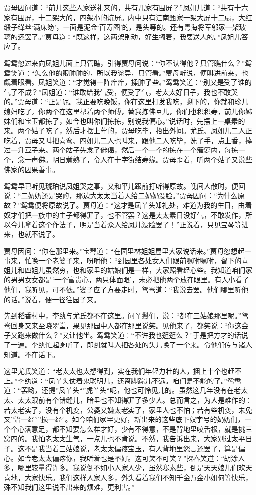 \documentclass[12pt,oneside]{book}
\begin{document}
贾母因问道：“前儿这些人家送礼来的，共有几家有围屏？”凤姐儿道：“共有十六家有围屏，十二架大的，四架小的炕屏。内中只有江南甄家一架大屏十二扇，大红缎子缂丝‘满床笏’，一面是泥金‘百寿图’的，是头等的。还有粤海将军邬家一架玻璃的还罢了。”贾母道：“既这样，这两架别动，好生搁着，我要送人的。”凤姐儿答应了。

鸳鸯忽过来向凤姐儿面上只管瞧，引得贾母问说：“你不认得他？只管瞧什么？”鸳鸯笑道：“怎么他的眼肿肿的，所以我诧异，只管看。”贾母听说，便叫进前来，也觑着眼看。凤姐笑道：“才觉得一阵痒痒，揉肿了些。”鸳鸯笑道：“别又是受了谁的气了不成？”凤姐道：“谁敢给我气受，便受了气，老太太好日子，我也不敢哭的。”贾母道：“正是呢。我正要吃晚饭，你在这里打发我吃，剩下的，你就和珍儿媳妇吃了。你两个在这里帮着两个师傅，替我拣佛豆儿，你们也积积寿，前儿你姊妹们和宝玉都拣了，如今也叫你们拣拣，别说我偏心。”说话时，先摆上一桌素的来。两个姑子吃了，然后才摆上荤的，贾母吃毕，抬出外间。尤氏、凤姐儿二人正吃着，贾母又叫把喜鸾、四姐儿二人也叫来，跟他二人吃毕，洗了手，点上香，捧过一升豆子来。两个姑子先念了佛偈，然后一个一个的拣在一个簸箩内，每拣一个，念一声佛。明日煮熟了，令人在十字街结寿缘。贾母歪着，听两个姑子又说些佛家的因果善事。

鸳鸯早已听见琥珀说凤姐哭之事，又和平儿跟前打听得原故。晚间人散时，便回说：“二奶奶还是哭的，那边大太太当着人给二奶奶没脸。”贾母因问：“为什么原故？”鸳鸯便将原故说了。贾母道：“这才是凤丫头知礼处，难道为我的生日，由着奴才们把一族中的主子都得罪了，也不管罢？这是太太素日没好气，不敢发作，所以今儿拿着这个作法子，明是当着众人给凤儿没脸罢了！”正说着，只见宝琴等进来，也就不说了。

贾母因问：“你在那里来。”宝琴道：“在园里林姐姐屋里大家说话来。”贾母忽想起一事来，忙唤一个老婆子来，吩咐他：“到园里各处女人们跟前嘱咐嘱咐，留下的喜姐儿和四姐儿虽然穷，也和家里的姑娘们是一样，大家照看经心些。我知道咱们家的男男女女都是‘一个富贵心，两只体面眼’，未必把他两个放在眼里。有人小看了他们，我听见，可不依。”婆子应了方要走时，鸳鸯道：“我说去罢。他们哪里听他的话。”说着，便一径往园子来。

先到稻香村中，李纨与尤氏都不在这里。问丫鬟们，说：“都在三姑娘那里呢。”鸳鸯回身又来至晓翠堂，果见那园中人都在那里说笑。见他来了，都笑说：“你这会子又跑来做什么？”又让他坐。鸳鸯笑道：“不许我也逛逛么？”于是把方才的话说了一遍。李纨忙起身听了，即刻就叫人把各处的头儿唤了一个来。令他们传与诸人知道。不在话下。

这里尤氏笑道：“老太太也太想得到，实在我们年轻力壮的人，捆上十个也赶不上。”李纨道：“凤丫头仗着鬼聪明儿，还离脚踪儿不远。咱们是不能的了。”鸳鸯道：“罢哟，还提”凤丫头“”虎丫头“呢，他也可怜见儿的。虽然这几年没有在老太太、太太跟前有个错缝儿，暗里也不知得罪了多少人。总而言之，为人是难作的：若太老实了，没有个机变，公婆又嫌太老实了，家里人也不怕；若有些机变，未免又”治一经“”损一经“。如今咱们家里更好，新出来的这些底下奴字号的奶奶们，一个个心满意足，都不知要怎么样才好，少有不得意，不是背地里咬舌根，就是挑三窝四的。我怕老太太生气，一点儿也不肯说。不然，我告诉出来，大家别过太平日子。这不是我当着三姑娘说，老太太偏疼宝玉，有人背地里怨言还罢了，算是偏心。如今老太太偏疼你，我听着也是不好。这可笑不可笑？”探春笑道：“胡涂人多，哪里较量得许多。我说倒不如小人家人少，虽然寒素些，倒是天天娘儿们欢天喜地，大家快乐。我们这样人家人多，外头看着我们不知千金万金小姐何等快乐，殊不知我们这里说不出来的烦难，更利害。”
\end{document}
